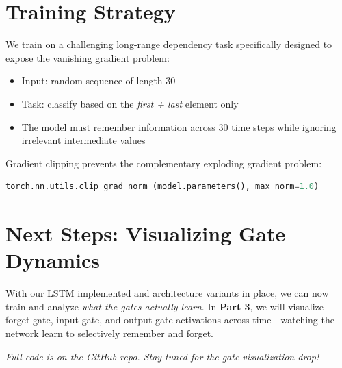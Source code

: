 \documentclass[12pt]{article}
\begin{document}
\section*{Training Strategy}
We train on a challenging long-range dependency task specifically designed to expose the vanishing gradient problem:
\begin{itemize}
    \item Input: random sequence of length 30
    \item Task: classify based on the \textit{first + last} element only
    \item The model must remember information across 30 time steps while ignoring irrelevant intermediate values
\end{itemize}

Gradient clipping prevents the complementary exploding gradient problem:
\begin{lstlisting}[language=Python, basicstyle=\small\ttfamily, commentstyle=\color{green!60!black}]
torch.nn.utils.clip_grad_norm_(model.parameters(), max_norm=1.0)
\end{lstlisting}

\section*{Next Steps: Visualizing Gate Dynamics}
With our LSTM implemented and architecture variants in place, we can now train and analyze \textit{what the gates actually learn}. In \textbf{Part 3}, we will visualize forget gate, input gate, and output gate activations across time---watching the network learn to selectively remember and forget.

\vspace{1em}
\noindent \textit{Full code is on the GitHub repo. Stay tuned for the gate visualization drop!}
\end{document}

